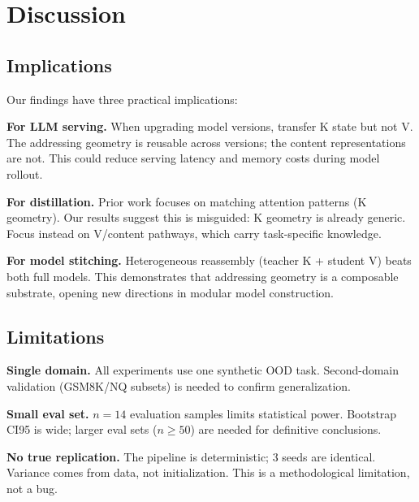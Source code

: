 
\section{Discussion}
\label{sec:discussion}

\subsection{Implications}

Our findings have three practical implications:

\textbf{For LLM serving.}
When upgrading model versions, transfer K state but not V.
The addressing geometry is reusable across versions;
the content representations are not.
This could reduce serving latency and memory costs
during model rollout.

\textbf{For distillation.}
Prior work focuses on matching attention patterns (K geometry).
Our results suggest this is misguided:
K geometry is already generic.
Focus instead on V/content pathways,
which carry task-specific knowledge.

\textbf{For model stitching.}
Heterogeneous reassembly (teacher K + student V)
beats both full models.
This demonstrates that addressing geometry is a composable substrate,
opening new directions in modular model construction.

\subsection{Limitations}

\textbf{Single domain.}
All experiments use one synthetic OOD task.
Second-domain validation (GSM8K/NQ subsets) is needed
to confirm generalization.

\textbf{Small eval set.}
$n = 14$ evaluation samples limits statistical power.
Bootstrap CI95 is wide; larger eval sets ($n \geq 50$)
are needed for definitive conclusions.

\textbf{No true replication.}
The pipeline is deterministic; 3 seeds are identical.
Variance comes from data, not initialization.
This is a methodological limitation, not a bug.

